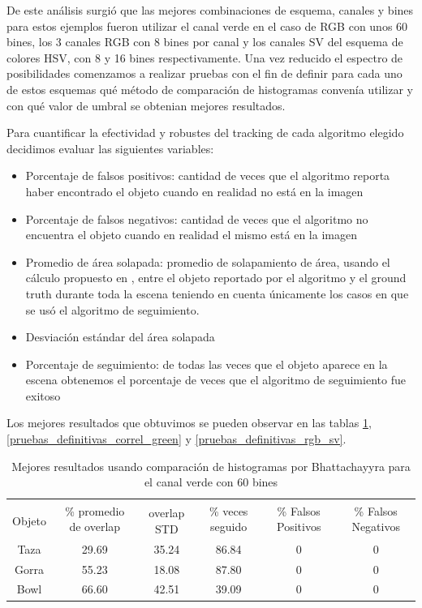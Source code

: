 De este análisis surgió que las mejores combinaciones de esquema, canales y bines para estos ejemplos fueron utilizar el canal verde en el caso de RGB con unos 60 bines, los 3 canales RGB con 8 bines por canal  y los canales SV del esquema de colores HSV, con 8 y 16 bines respectivamente. Una vez reducido el espectro de posibilidades comenzamos a realizar pruebas con el fin de definir para cada uno de estos esquemas qué método de comparación de histogramas convenía utilizar y con qué valor de umbral se obtenian mejores resultados. 

Para cuantificar la efectividad y robustes del tracking de cada algoritmo elegido decidimos evaluar las siguientes variables:
\begin{itemize}
	\item Porcentaje de falsos positivos: cantidad de veces que el algoritmo reporta haber encontrado el objeto cuando en realidad no está en la imagen
	\item Porcentaje de falsos negativos: cantidad de veces que el algoritmo no encuentra el objeto cuando en realidad el mismo está en la imagen
	\item Promedio de área solapada: promedio de solapamiento de área, usando el cálculo propuesto en \cite{everinghampascal}, entre el objeto reportado por el algoritmo y el ground truth durante toda la escena teniendo en cuenta únicamente los casos en que se usó el algoritmo de seguimiento.
	\item Desviación estándar del área solapada
	\item Porcentaje de seguimiento: de todas las veces que el objeto aparece en la escena obtenemos el porcentaje de veces que el algoritmo de seguimiento fue exitoso	
\end{itemize}

Los mejores resultados que obtuvimos se pueden observar en las tablas \ref{pruebas_definitivas_bhatta_green}, \ref{pruebas_definitivas_correl_green} y \ref{pruebas_definitivas_rgb_sv}. 

\begin{table}[h]
	\begin{tabular}{|c|c|c|c|c|c|}
	    \hline
	    & \multirow{2}{2.4cm}{\% promedio de overlap} & & \multirow{2}{2cm}{\% veces seguido} & \multirow{2}{1.6cm}{\% Falsos Positivos} & \multirow{2}{1.6cm}{\% Falsos Negativos}\\
		Objeto & & overlap STD & & &\\
	    \hline
	    Taza   & 29.69      & 35.24       & 86.84             & 0                & 0\\
	    \hline
	    Gorra  & 55.23      & 18.08       & 87.80             & 0                & 0\\
	    \hline
	    Bowl   & 66.60      & 42.51       & 39.09             & 0                & 0\\
	    \hline
    \end{tabular}
	\caption{Mejores resultados usando comparación de histogramas por Bhattachayyra para el canal verde con 60 bines}
	\label{pruebas_definitivas_bhatta_green}
\end{table}

